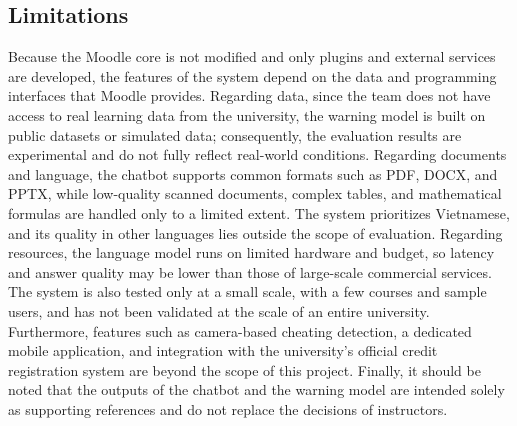 \subsection{Limitations}
Because the Moodle core is not modified and only plugins and external services are developed, the features of the system depend on the data and programming interfaces that Moodle provides. Regarding data, since the team does not have access to real learning data from the university, the warning model is built on public datasets or simulated data; consequently, the evaluation results are experimental and do not fully reflect real-world conditions.
Regarding documents and language, the chatbot supports common formats such as PDF, DOCX, and PPTX, while low-quality scanned documents, complex tables, and mathematical formulas are handled only to a limited extent. The system prioritizes Vietnamese, and its quality in other languages lies outside the scope of evaluation. Regarding resources, the language model runs on limited hardware and budget, so latency and answer quality may be lower than those of large-scale commercial services. The system is also tested only at a small scale, with a few courses and sample users, and has not been validated at the scale of an entire university.
Furthermore, features such as camera-based cheating detection, a dedicated mobile application, and integration with the university's official credit registration system are beyond the scope of this project. Finally, it should be noted that the outputs of the chatbot and the warning model are intended solely as supporting references and do not replace the decisions of instructors.
